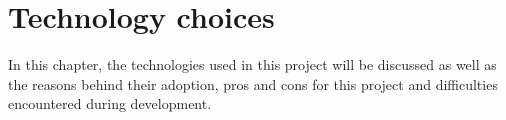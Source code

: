 \chapter{Technology choices}\label{chap:tech_choices}

  In this chapter, the technologies used in this project will be discussed
  as well as the reasons behind their adoption, pros and cons for this project
  and difficulties encountered during development.

  
  
  
  

